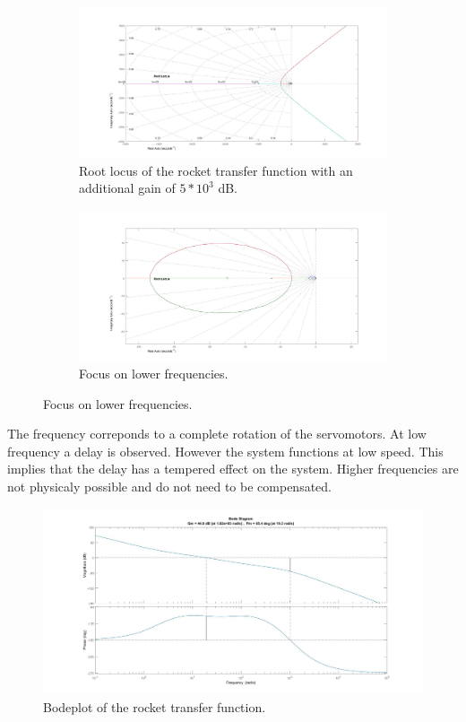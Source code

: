 \begin{figure}[htbp]
	\centering
	\begin{subfigure}{0.45\textwidth}
		\includegraphics[width=\textwidth]{figures/Rocket/design/tf_with_controller_5}
		\caption{Root locus of the rocket transfer function with an additional gain of $5 * 10^3$ \si{\dB}.}
		\label{fig:FinalRocketTf}
	\end{subfigure}
	\begin{subfigure}{0.45\textwidth}
		\includegraphics[width=\textwidth]{figures/Rocket/design/tf_with_controller_5_zoom}
		\caption{Focus on lower frequencies.}
		\label{fig:FinalRocketTfZoom}
	\end{subfigure}
		
\end{figure}


The frequency correponds to a complete rotation of the servomotors. At low frequency a delay is observed. However the system functions at low speed. This implies that the delay has a tempered effect on the system. Higher frequencies are not physicaly possible and do not need to be compensated.

\begin{figure}[htbp]
	\centering
		\includegraphics[width=\textwidth]{figures/Rocket/design/bodeplot}
		\caption{Bodeplot of the rocket transfer function.}
		\label{fig:BodeplotFinalTf}
\end{figure}